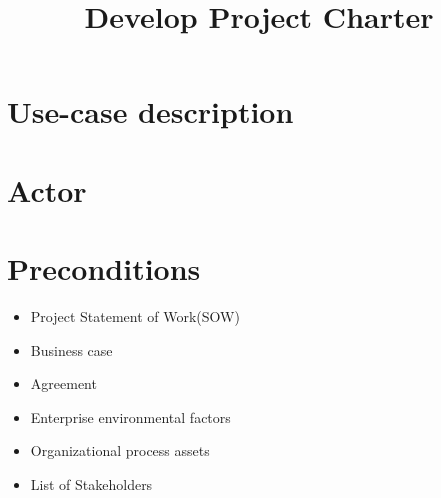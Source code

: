 \documentclass[notitlepage]{article}
\date{}
\author{}
\title{#1}
\newcommand{\name}[1]{%
   \title{#1}
   \maketitle
}
\begin{document}
   \name{Develop Project Charter}

\vspace{-2cm}%

\section{Use-case description}

\begin{comment}
	{\noindent Development of project charter is the ability to let the user create a project charter.}
\end{comment}


\section{Actor}

\begin{comment}
	{Project Manager/User}
\end{comment}
\section{Preconditions}

\begin{comment}
	{The following preconditions have to be present:}
\end{comment}

\begin{itemize}
  \item Project Statement of Work(SOW)
  \item Business case
  \item Agreement
  \item Enterprise environmental factors
  \item Organizational process assets 
  \item List of Stakeholders
\end{itemize}
\end{document}
